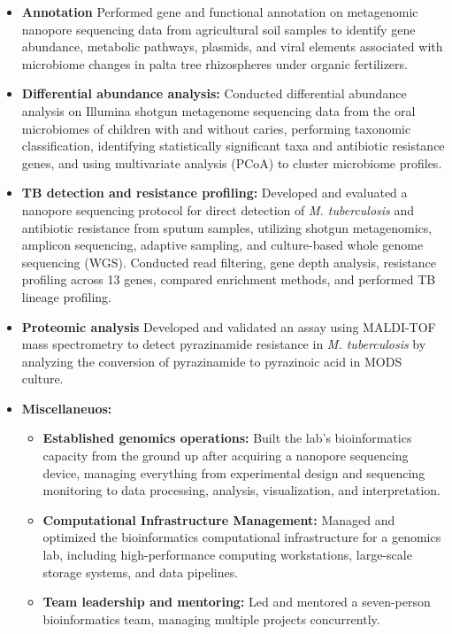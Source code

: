 \documentclass[11pt,a4paper,sans]{moderncv}
\begin{document}
  \cventry{}{}
  {}{}{}
  {\begin{itemize}%
    \item \textbf{Annotation} Performed gene and functional annotation on metagenomic nanopore sequencing data from agricultural soil samples to identify gene abundance, metabolic pathways, plasmids, and viral elements associated with microbiome changes in palta tree rhizospheres under organic fertilizers. 
    \item \textbf{Differential abundance analysis:} Conducted differential abundance analysis on Illumina shotgun metagenome sequencing data from the oral microbiomes of children with and without caries, performing taxonomic classification, identifying statistically significant taxa and antibiotic resistance genes, and using multivariate analysis (PCoA) to cluster microbiome profiles.
    \item \textbf{TB detection and resistance profiling:} Developed and evaluated a nanopore sequencing protocol for direct detection of \textit{M. tuberculosis} and antibiotic resistance from sputum samples, utilizing shotgun metagenomics, amplicon sequencing, adaptive sampling, and culture-based whole genome sequencing (WGS). Conducted read filtering, gene depth analysis, resistance profiling across 13 genes, compared enrichment methods, and performed TB lineage profiling.
    \item \textbf{Proteomic analysis} Developed and validated an assay using MALDI-TOF mass spectrometry to detect pyrazinamide resistance in \textit{M. tuberculosis} by analyzing the conversion of pyrazinamide to pyrazinoic acid in MODS culture.
    \item \textbf{Miscellaneuos:}
    \begin{itemize}
      \item \textbf{Established genomics operations:} Built the lab's bioinformatics capacity from the ground up after acquiring a nanopore sequencing device, managing everything from experimental design and sequencing monitoring to data processing, analysis, visualization, and interpretation.
      \item \textbf{Computational Infrastructure Management:} Managed and optimized the bioinformatics computational infrastructure for a genomics lab, including high-performance computing workstations, large-scale storage systems, and data pipelines.
      \item \textbf{Team leadership and mentoring:} Led and mentored a seven-person bioinformatics team, managing multiple projects concurrently.
      \end{itemize}
  \end{itemize}
  }
\end{document}
